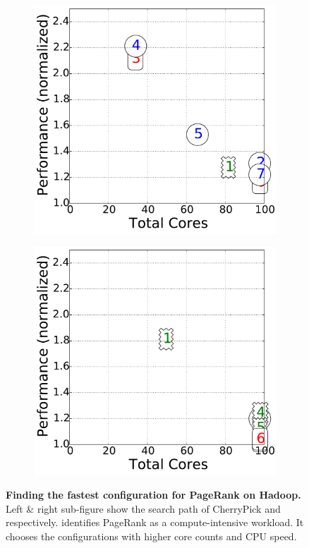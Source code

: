\begin{figure}[!htbp]
\centering
\begin{subfigure}[b]{0.4\textwidth}
    \includegraphics[width=\linewidth]{figures/multiple_bo_time_hadoop.pagerank.bigdata_12_cores.pdf}
    \caption{\cherrypick}
    \label{fig:comparison_time_cherrypick}
\end{subfigure}
\begin{subfigure}[b]{0.4\textwidth}
    \includegraphics[width=\linewidth]{figures/multiple_scout_time_hadoop.pagerank.bigdata_24_m4.large_cores.pdf}
    \caption{\scout}
    \label{fig:comparison_time_scout}
\end{subfigure}
 \caption{\small{\textbf{Finding the fastest configuration for PageRank on Hadoop.} Left \& right sub-figure show the search path of CherryPick and \scout respectively. \scout identifies PageRank as a compute-intensive workload.  It chooses the configurations with higher core counts and CPU speed.}}
\label{fig:compare_1}
\end{figure}


